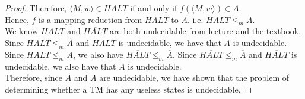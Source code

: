 \documentclass[12pt]{article}
\begin{document}
\begin{proof}
Therefore, $\langle M, w \rangle \in HALT$ if and only if $f(\langle M, w \rangle) \in A$. \\

Hence, $f$ is a mapping reduction from $HALT$ to $A$. i.e. $HALT \leq_m A$. \\

We know $HALT$ and $\overline{HALT}$ are both undecidable from lecture and the textbook. Since $HALT \leq_m A$ and $HALT$ is undecidable, we have that $A$ is undecidable. Since $HALT \leq_m A$, we also have $\overline{HALT} \leq_m \overline{A}$. Since $\overline{HALT} \leq_m \overline{A}$ and $\overline{HALT}$ is undecidable, we also have that $\overline{A}$ is undecidable. \\

Therefore, since $A$ and $\overline{A}$ are undecidable, we have shown that the problem of determining whether a TM has any useless states is undecidable. 
\end{proof}
\end{document}
